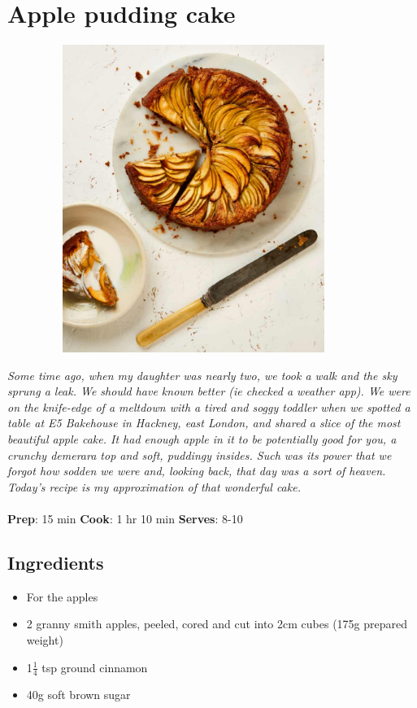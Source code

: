 \documentclass{book}
\begin{document}
\section{Apple pudding cake}
\begin{figure}
\centering\includegraphics[width=10cm,height=10cm,keepaspectratio]{Recipe_Pictures/Apple_pudding_cake.png}
\end{figure}
\emph{Some time ago, when my daughter was nearly two, we took a walk and the sky sprung a leak. We should have known better (ie checked a weather app). We were on the knife-edge of a meltdown with a tired and soggy toddler when we spotted a table at E5 Bakehouse in Hackney, east London, and shared a slice of the most beautiful apple cake. It had enough apple in it to be potentially good for you, a crunchy demerara top and soft, puddingy insides. Such was its power that we forgot how sodden we were and, looking back, that day was a sort of heaven. Today’s recipe is my approximation of that wonderful cake.}\\\\ 
\textbf{Prep}: 15 min
\textbf{Cook}: 1 hr 10 min
\textbf{Serves}: 8-10
\subsection*{Ingredients}
\begin{itemize}
\item For the apples
\item 2 granny smith apples, peeled, cored and cut into 2cm cubes (175g prepared weight)
\item 1$\frac{1}{4}$ tsp ground cinnamon
\item 40g soft brown sugar
\end{itemize}
\end{document}
